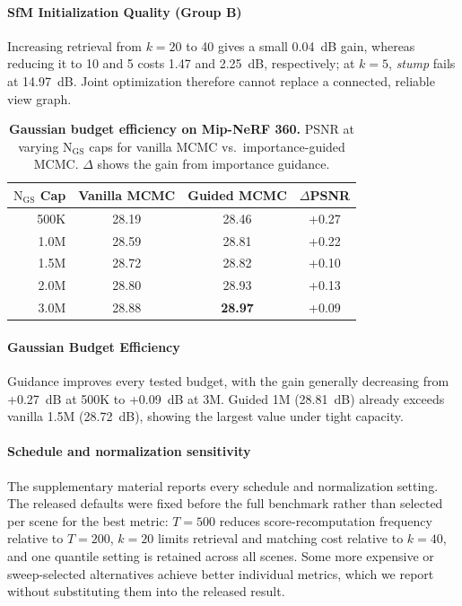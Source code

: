 \documentclass[sigconf]{acmart}
\begin{document}
\paragraph{SfM Initialization Quality (Group B)}
Increasing retrieval from $k{=}20$ to 40 gives a small 0.04~dB gain, whereas reducing it to 10 and 5 costs 1.47 and 2.25~dB, respectively; at $k{=}5$, \textit{stump} fails at 14.97~dB. Joint optimization therefore cannot replace a connected, reliable view graph.

\begin{table}[t]
    \centering
    \footnotesize
    \setlength\tabcolsep{4pt}
    \caption{
        \textbf{Gaussian budget efficiency on Mip-NeRF 360.} PSNR at varying $\mathrm{N_{GS}}$ caps for vanilla MCMC vs.\ importance-guided MCMC. $\Delta$ shows the gain from importance guidance.
    }
    \begin{tabular}{r cc c}
        \toprule
        $\mathrm{N_{GS}}$ Cap & Vanilla MCMC & Guided MCMC & $\Delta$PSNR \\
        \midrule
        500K  & 28.19 & 28.46 & +0.27 \\
        1.0M  & 28.59 & 28.81 & +0.22 \\
        1.5M  & 28.72 & 28.82 & +0.10 \\
        2.0M  & 28.80 & 28.93 & +0.13 \\
        3.0M  & 28.88 & \textbf{28.97} & +0.09 \\
        \bottomrule
    \end{tabular}
    \label{tab:budget}
\end{table}

\paragraph{Gaussian Budget Efficiency}
Guidance improves every tested budget, with the gain generally decreasing from +0.27~dB at 500K to +0.09~dB at 3M. Guided 1M (28.81~dB) already exceeds vanilla 1.5M (28.72~dB), showing the largest value under tight capacity.

\paragraph{Schedule and normalization sensitivity}
The supplementary material reports every schedule and normalization setting. The released defaults were fixed before the full benchmark rather than selected per scene for the best metric: $T{=}500$ reduces score-recomputation frequency relative to $T{=}200$, $k{=}20$ limits retrieval and matching cost relative to $k{=}40$, and one quantile setting is retained across all scenes. Some more expensive or sweep-selected alternatives achieve better individual metrics, which we report without substituting them into the released result.
\end{document}
